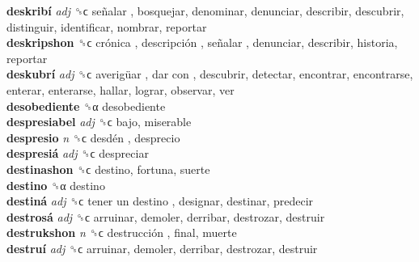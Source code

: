 \textbf{deskribí} \emph{adj}  ␝ϲ   señalar , bosquejar, denominar, denunciar, describir, descubrir, distinguir, identificar, nombrar, reportar  \\
\textbf{deskripshon} ␝ϲ   crónica ,  descripción ,  señalar , denunciar, describir, historia, reportar  \\
\textbf{deskubrí} \emph{adj}  ␝ϲ   averigüar ,  dar con , descubrir, detectar, encontrar, encontrarse, enterar, enterarse, hallar, lograr, observar, ver  \\
\textbf{desobediente} ␝α  desobediente  \\
\textbf{despresiabel} \emph{adj}  ␝ϲ  bajo, miserable  \\
\textbf{despresio} \emph{n}  ␝ϲ   desdén , desprecio  \\
\textbf{despresiá} \emph{adj}  ␝ϲ  despreciar  \\
\textbf{destinashon} ␝ϲ  destino, fortuna, suerte  \\
\textbf{destino} ␝α  destino  \\
\textbf{destiná} \emph{adj}  ␝ϲ   tener un destino , designar, destinar, predecir  \\
\textbf{destrosá} \emph{adj}  ␝ϲ  arruinar, demoler, derribar, destrozar, destruir  \\
\textbf{destrukshon} \emph{n}  ␝ϲ   destrucción , final, muerte  \\
\textbf{destruí} \emph{adj}  ␝ϲ  arruinar, demoler, derribar, destrozar, destruir  \\
